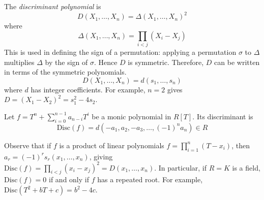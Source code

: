 \begin{example}
	The \emph{discriminant polynomial} is
	\[ D(X_1, \dots, X_n) = \Delta(X_1, \dots, X_n)^2 \]
	where
	\[ \Delta(X_1, \dots, X_n) = \prod_{i < j} (X_i - X_j) \]
	This is used in defining the sign of a permutation: applying a permutation \( \sigma \) to \( \Delta \) multiplies \( \Delta \) by the sign of \( \sigma \).
	Hence \( D \) is symmetric.
	Therefore, \( D \) can be written in terms of the symmetric polynomials.
	\[ D(X_1, \dots, X_n) = d(s_1, \dots, s_n) \]
	where \( d \) has integer coefficients.
	For example, \( n = 2 \) gives \( D = (X_1 - X_2)^2 = s_1^2 - 4s_2 \).
\end{example}
\begin{definition}
	Let \( f = T^n + \sum_{i=0}^{n-1} a_{n-i} T^i \) be a monic polynomial in \( R[T] \).
	Its discriminant is
	\[ \mathrm{Disc}(f) = d(-a_1, a_2, -a_3, \dots, (-1)^n a_n) \in R \]
\end{definition}
Observe that if \( f \) is a product of linear polynomials \( f = \prod_{i=1}^n (T - x_i) \), then \( a_r = (-1)^r s_r(x_1, \dots, x_n) \), giving \( \mathrm{Disc}(f) = \prod_{i < j} (x_i - x_j)^2 = D(x_1, \dots, x_n) \).
In particular, if \( R = K \) is a field, \( \mathrm{Disc}(f) = 0 \) if and only if \( f \) has a repeated root.
For example, \( \mathrm{Disc}(T^2 + bT + c) = b^2 - 4c \).
